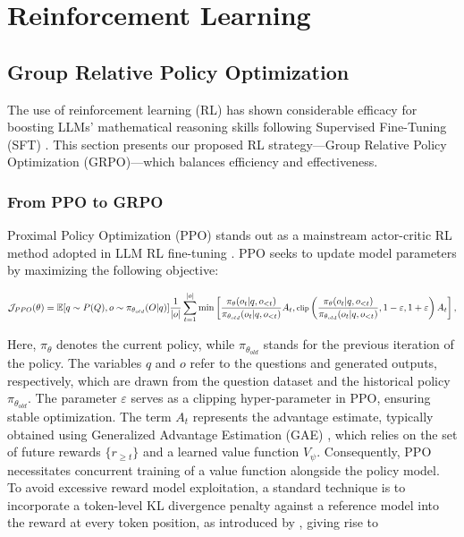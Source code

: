 \section{Reinforcement Learning}

\subsection{Group Relative Policy Optimization}
The use of reinforcement learning (RL) has shown considerable efficacy for boosting LLMs' mathematical reasoning skills following Supervised Fine-Tuning (SFT) \citep{wang2023math, wizardmath}. This section presents our proposed RL strategy—Group Relative Policy Optimization (GRPO)—which balances efficiency and effectiveness.

\subsubsection{From PPO to GRPO}
Proximal Policy Optimization (PPO) \citep{schulman2017proximal} stands out as a mainstream actor-critic RL method adopted in LLM RL fine-tuning \citep{ouyang2022training}. PPO seeks to update model parameters by maximizing the following objective:

\begin{equation}
\footnotesize
    \mathcal{J}_{PPO}(\theta) = \mathbb{E}{[q \sim P(Q), o \sim \pi_{\theta_{old}}(O|q)]} \frac{1}{|o|} \sum_{t=1}^{|o|} \min \left[ \frac{\pi_\theta(o_{t} | q, o_{<t})}{\pi_{\theta_{old}}(o_{t} | q, o_{<t})} A_{t}, \text{clip} \left( \frac{\pi_\theta(o_{t} | q, o_{<t})}{\pi_{\theta_{old}}(o_{t} | q, o_{<t})}, 1 - \varepsilon, 1 + \varepsilon \right)  A_{t} \right] ,
\end{equation}

Here, $\pi_{\theta}$ denotes the current policy, while $\pi_{\theta_{old}}$ stands for the previous iteration of the policy. The variables $q$ and $o$ refer to the questions and generated outputs, respectively, which are drawn from the question dataset and the historical policy $\pi_{\theta_{old}}$. The parameter $\varepsilon$ serves as a clipping hyper-parameter in PPO, ensuring stable optimization. The term $A_t$ represents the advantage estimate, typically obtained using Generalized Advantage Estimation (GAE) \citep{gae}, which relies on the set of future rewards $\{r_{\ge t}\}$ and a learned value function $V_{\psi}$. Consequently, PPO necessitates concurrent training of a value function alongside the policy model. To avoid excessive reward model exploitation, a standard technique is to incorporate a token-level KL divergence penalty against a reference model into the reward at every token position, as introduced by \citet{ouyang2022training}, giving rise to

